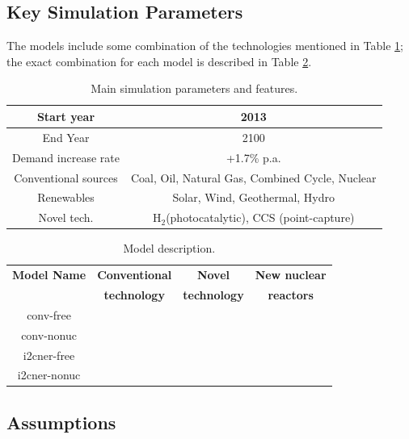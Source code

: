 \documentclass[14pt,a4paper]{article} %
\newcommand{\greencheck}{{\color{green}\checkmark}}
\newcommand{\xmark}{{\color{red}\ding{55}}}
\begin{document}
\subsection{Key Simulation Parameters}

The models include some combination of the technologies mentioned in Table \ref{tab:basic}; the exact combination for each model is described in Table \ref{tab:models}.

\begin{table}[H]
\centering
\caption{\label{tab:basic} Main simulation parameters and features.}
\begin{tabular}{|c|c|}
\hline
Start year & 2013 \\
\hline
End Year & 2100 \\
\hline
Demand increase rate & +1.7\% p.a. \cite{noauthor_electricity_2017} \\
\hline
Conventional sources & Coal, Oil, Natural Gas, Combined Cycle, Nuclear \\
\hline
Renewables & Solar, Wind, Geothermal, Hydro \\
\hline
Novel tech. & H$_2$(photocatalytic), \gls{CCS} (point-capture)\\
\hline
\end{tabular}
\end{table}

\begin{table}[H]
\centering
\caption{\label{tab:models} Model description.}
\begin{tabular}{| c | c | c | c |}
\hline
\textbf{Model Name}&\textbf{Conventional}&\textbf{Novel}&\textbf{New nuclear}\\
            &\textbf{technology}&\textbf{technology}&\textbf{reactors}\\
                  \hline
conv-free &      \greencheck           &         \xmark       &      \greencheck     \\ 
conv-nonuc &      \greencheck           &         \xmark       &         \xmark       \\ 
i2cner-free &      \greencheck           &      \greencheck     &      \greencheck     \\ 
i2cner-nonuc &      \greencheck           &      \greencheck     &         \xmark       \\
\hline
\end{tabular}
\end{table}

\subsection{Assumptions}
\end{document}
